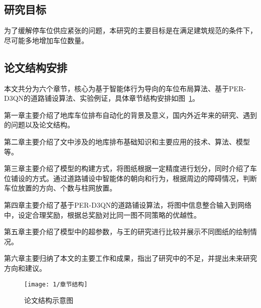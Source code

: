 \subsection{研究目标}
为了缓解停车位供应紧张的问题，本研究的主要目标是在满足建筑规范的条件下，尽可能多地增加车位数量。

\subsection{论文结构安排}
本文共分为六个章节，核心为基于智能体行为导向的车位布局算法、基于PER-D3QN的道路铺设算法、实验例证，具体章节结构安排如图~\ref{fig:chapter_structure}。

第一章主要介绍了地库车位排布自动化的背景及意义，国内外近年来的研究、遇到的问题以及论文结构。

第二章主要介绍了文中涉及的地库排布基础知识和主要应用的技术、算法、模型等。

第三章主要介绍了模型的构建方式，将图纸根据一定精度进行划分，同时介绍了车位铺设的方式。通过道路铺设中智能体的朝向和行为，根据周边的障碍情况，判断车位放置的方向、个数与柱网放置。

第四章主要介绍了基于PER-D3QN的道路铺设算法，将图中信息整合输入到网络中，设定合理奖励，根据总奖励对比同一图不同策略的优越性。

第五章主要介绍了模型中的超参数，与王的研究进行比较并展示不同图纸的绘制情况。

第六章主要归纳了本文的主要工作和成果，指出了研究中的不足，并提出未来研究方向和建议。
\begin{figure}[!htb]
  \centering
  \texttt{[image: 1/章节结构]}
  \caption{论文结构示意图}
  \label{fig:chapter_structure}
\end{figure}